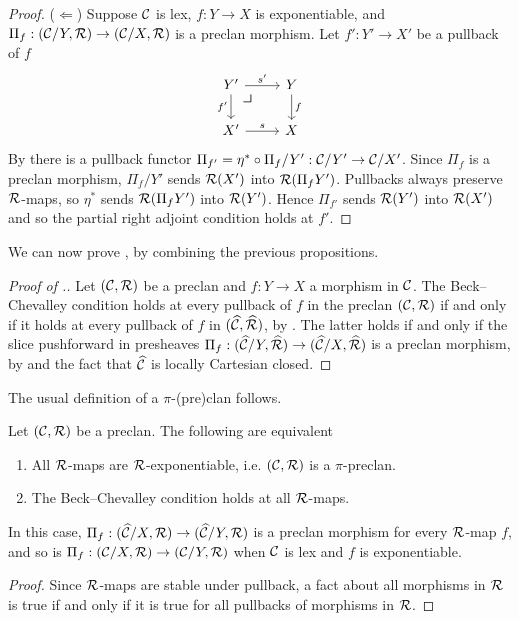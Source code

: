 \begin{proof}
  ($\Leftarrow$)
  Suppose $\mathcal{C}$ is lex, $f : Y \to X$ is exponentiable,
  and $\Pi_f : (\mathcal{C}/Y,\mathcal{R}) \to (\mathcal{C}/X,\mathcal{R})$ is a preclan morphism.
  Let $f' : Y' \to X'$ be a pullback of $f$
  \[
    \begin{tikzcd}
      Y' \ar[r, "s'"] \ar[d, "f'"'] \pbcorner & Y \ar[d, "f"] \\
      X' \ar[r, "s"] & X
    \end{tikzcd}
  \]
  By  there is
  a pullback functor
  $\Pi_{f'} = \eta^* \circ \Pi_f / Y' : \mathcal{C} / Y' \to \mathcal{C} / X'$.
  Since $\Pi_f$ is a preclan morphism,
  $\Pi_f / Y'$ sends $\mathcal{R}(X')$ into $\mathcal{R}(\Pi_f Y')$.
  Pullbacks always preserve $\mathcal{R}$-maps,
  so $\eta^*$ sends $\mathcal{R}(\Pi_f Y')$ into $\mathcal{R}(Y')$.
  Hence $\Pi_{f'}$ sends $\mathcal{R}(Y')$ into $\mathcal{R}(X')$
  and so the partial right adjoint condition holds at $f'$.
\end{proof}

We can now prove ,
by combining the previous propositions.

\begin{proof}[Proof of .]
  Let $(\mathcal{C},\mathcal{R})$ be a preclan and $f : Y \to X$ a morphism in $\mathcal{C}$.
  The Beck--Chevalley condition holds at every pullback of
  $f$ in the preclan $(\mathcal{C},\mathcal{R})$
  if and only if 
  it holds at every pullback of $f$ in $(\widehat{\mathcal{C}},\widehat{\mathcal{R}})$,
  by .
  The latter holds if and only if
  the slice pushforward in presheaves $\Pi_f : (\widehat{\mathcal{C}}/Y, \widehat{\mathcal{R}}) \to (\widehat{\mathcal{C}}/X, \widehat{\mathcal{R}})$
  is a preclan morphism,
  by 
  and the fact that $\widehat{\mathcal{C}}$ is locally Cartesian closed.
\end{proof}

The usual definition of a $\pi$-(pre)clan follows.

\begin{corollary} \label{cor:pi-preclan}
  Let $(\mathcal{C}, \mathcal{R})$ be a preclan.
  The following are equivalent
  \begin{enumerate}
  \item
    All $\mathcal{R}$-maps are $\mathcal{R}$-exponentiable,
    i.e. $(\mathcal{C}, \mathcal{R})$ is a $\pi$-preclan.
  \item
    The Beck--Chevalley condition holds at all $\mathcal{R}$-maps.
  \end{enumerate}
  In this case, $\Pi_f : (\widehat{\mathcal{C}} / X, \mathcal{R}) \to (\widehat{\mathcal{C}} / Y, \mathcal{R})$
  is a preclan morphism for every $\mathcal{R}$-map $f$,
  and so is $\Pi_f : (\mathcal{C} / X, \mathcal{R}) \to (\mathcal{C} / Y, \mathcal{R})$
  when $\mathcal{C}$ is lex and $f$ is exponentiable.
\end{corollary}
\begin{proof}
  Since $\mathcal{R}$-maps are stable under pullback,
  a fact about all morphisms in $\mathcal{R}$ is true if and only if
  it is true for all pullbacks of morphisms in $\mathcal{R}$.
\end{proof}

